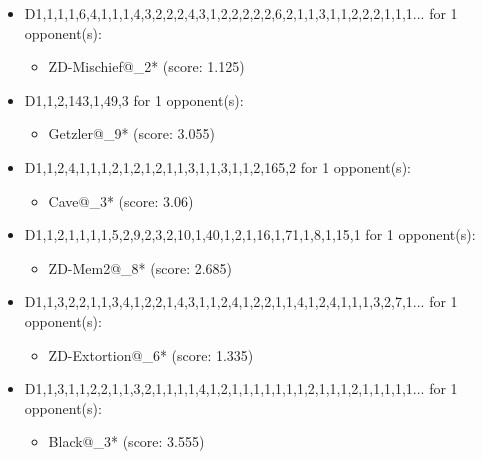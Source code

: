 \begin{appendices}
\begin{itemize}
    \item D1,1,1,1,6,4,1,1,1,4,3,2,2,2,4,3,1,2,2,2,2,2,6,2,1,1,3,1,1,2,2,2,1,1,1... for 1 opponent(s):
    \begin{multicols}{3}
         \begin{itemize}
            \item ZD-Mischief@\_2* (score: 1.125)
        \end{itemize}
     \end{multicols}
     
    \item D1,1,2,143,1,49,3 for 1 opponent(s):
    \begin{multicols}{3}
         \begin{itemize}
            \item Getzler@\_9* (score: 3.055)
        \end{itemize}
     \end{multicols}
     
    \item D1,1,2,4,1,1,1,2,1,2,1,2,1,1,3,1,1,3,1,1,2,165,2 for 1 opponent(s):
    \begin{multicols}{3}
         \begin{itemize}
            \item Cave@\_3* (score: 3.06)
        \end{itemize}
     \end{multicols}
     
    \item D1,1,2,1,1,1,1,5,2,9,2,3,2,10,1,40,1,2,1,16,1,71,1,8,1,15,1 for 1 opponent(s):
    \begin{multicols}{3}
         \begin{itemize}
            \item ZD-Mem2@\_8* (score: 2.685)
        \end{itemize}
     \end{multicols}
     
    \item D1,1,3,2,2,1,1,3,4,1,2,2,1,4,3,1,1,2,4,1,2,2,1,1,4,1,2,4,1,1,1,3,2,7,1... for 1 opponent(s):
    \begin{multicols}{3}
         \begin{itemize}
            \item ZD-Extortion@\_6* (score: 1.335)
        \end{itemize}
     \end{multicols}
     
    \item D1,1,3,1,1,2,2,1,1,3,2,1,1,1,1,4,1,2,1,1,1,1,1,1,1,2,1,1,1,2,1,1,1,1,1... for 1 opponent(s):
    \begin{multicols}{3}
         \begin{itemize}
            \item Black@\_3* (score: 3.555)
        \end{itemize}
     \end{multicols}
     

\end{itemize}
\end{appendices}
